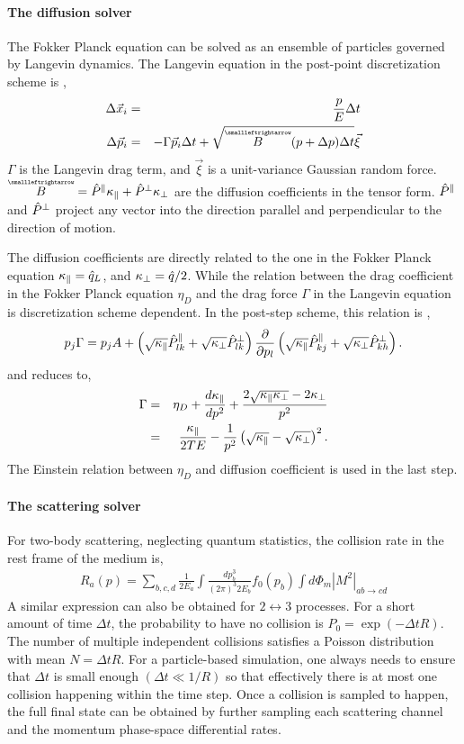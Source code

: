 \paragraph{The diffusion solver}
The Fokker Planck equation can be solved as an ensemble of particles governed by Langevin dynamics.
The Langevin equation in the post-point discretization scheme is \cite{He:2013zua},
\begin{eqnarray}
\Delta \vec{x}_i &=& \frac{p}{E}\Delta t\\
\Delta \vec{p}_i &=& -\Gamma \vec{p}_i \Delta t + \sqrt{\tensor{B}(p+\Delta p) \Delta t  }\vec{\xi}
\end{eqnarray}
$\Gamma$ is the Langevin drag term, and $\vec{\xi}$ is a unit-variance Gaussian random force.
$\tensor{B} = \Ppara \Kpara + \Pperp \Kperp$ are the diffusion coefficients in the tensor form.
$\hat{P}^{\|}$ and $\hat{P}^{\perp}$ project any vector into the direction parallel and perpendicular to the direction of motion.

The diffusion coefficients are directly related to the one in the Fokker Planck equation $\kappa_{\|} = \hat{q}_L$, and $\kappa_{\perp} = \hat{q}/2$.
While the relation between the drag coefficient in the Fokker Planck equation $\eta_D$ and the drag force $\Gamma$ in the Langevin equation is discretization scheme dependent.
In the post-step scheme, this relation is \cite{He:2013zua},
\begin{eqnarray}
p_j \Gamma  = p_jA + \left(\sqrt{\kappa_{\|}}\hat{P}^{\|}_{lk} + \sqrt{\kappa_{\perp}}\hat{P}^{\perp}_{lk}\right) \frac{\partial}{\partial p_l} \left( \sqrt{\kappa_{\|}}\hat{P}^{\|}_{kj} + \sqrt{\kappa_{\perp}}\hat{P}^{\perp}_{kh} \right).
\end{eqnarray}
and reduces to,
\begin{eqnarray}
\Gamma &=& \eta_D + \frac{d \kappa_{\|}}{dp^2} + \frac{2\sqrt{\kappa_{\|}\kappa_{\perp}} - 2\kappa_{\perp}}{p^2} \\
 &=& \frac{\kappa_{\|}}{2TE} - \frac{1}{p^2}\left( \sqrt{\kappa_{\|}} - \sqrt{\kappa_{\perp}} \right)^2.
\end{eqnarray}
The Einstein relation between $\eta_D$ and diffusion coefficient is used in the last step.

\paragraph{The scattering solver}
For two-body scattering, neglecting quantum statistics, the collision rate in the rest frame of the medium is,
\begin{eqnarray}
R_a(p) = \sum_{b,c,d}\frac{1}{2E_a}\int \frac{dp_b^3}{(2\pi)^3 2E_b} f_0(p_b) \int d\Phi_m |M^2|_{ab\rightarrow cd}
\end{eqnarray}
A similar expression can also be obtained for $2\leftrightarrow 3$ processes.
For a short amount of time $\Delta t$, the probability to have no collision is $P_{0} = \exp(-\Delta t R)$.
The number of multiple independent collisions satisfies a Poisson distribution with mean $N = \Delta t R$. 
For a particle-based simulation, one always needs to ensure that $\Delta t$ is small enough $(\Delta t \ll 1/R)$ so that effectively there is at most one collision happening within the time step.
Once a collision is sampled to happen, the full final state can be obtained by further sampling each scattering channel and the momentum phase-space differential rates.

